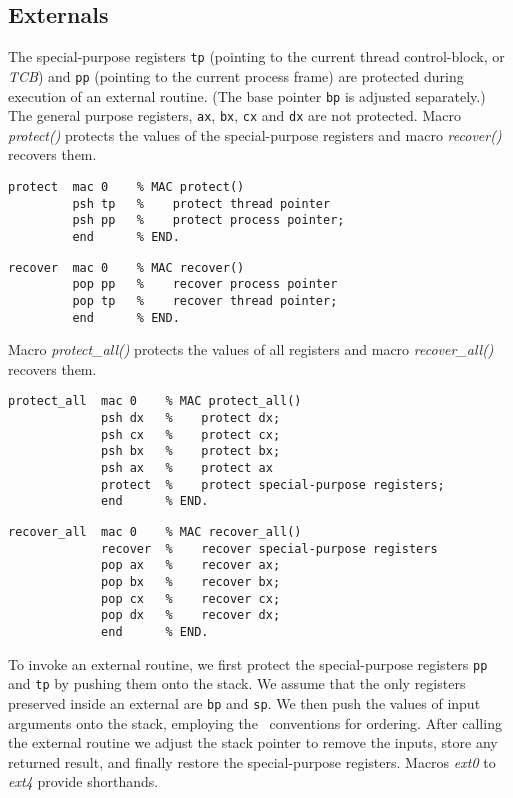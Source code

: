 \subsection{Externals}\label{externals}

The special-purpose registers \texttt{tp} (pointing to the current thread control-block, or \emph{TCB}) and \texttt{pp} (pointing to the current process frame) are protected during execution of an external routine. (The base pointer \texttt{bp} is adjusted separately.) The general purpose registers, \texttt{ax}, \texttt{bx}, \texttt{cx} and \texttt{dx} are not protected. Macro \textit{protect()} protects the values of the special-purpose registers and macro \textit{recover()} recovers them.


{\small
\begin{verbatim}
protect  mac 0    % MAC protect()
         psh tp   %    protect thread pointer
         psh pp   %    protect process pointer;
         end      % END.
\end{verbatim}}

{\small
\begin{verbatim}
recover  mac 0    % MAC recover()
         pop pp   %    recover process pointer
         pop tp   %    recover thread pointer;
         end      % END.
\end{verbatim}}

Macro \textit{protect\_all()} protects the values of all registers and macro \textit{recover\_all()} recovers them.


{\small
\begin{verbatim}
protect_all  mac 0    % MAC protect_all()
             psh dx   %    protect dx;
             psh cx   %    protect cx;
             psh bx   %    protect bx;
             psh ax   %    protect ax
             protect  %    protect special-purpose registers;
             end      % END.
\end{verbatim}}

{\small
\begin{verbatim}
recover_all  mac 0    % MAC recover_all()
             recover  %    recover special-purpose registers
             pop ax   %    recover ax;
             pop bx   %    recover bx;
             pop cx   %    recover cx;
             pop dx   %    recover dx;
             end      % END.
\end{verbatim}}



To invoke an external routine, we first protect the special-purpose registers \texttt{pp} and \texttt{tp} by pushing them onto the stack. We assume that the only registers preserved inside an external are \texttt{bp} and \texttt{sp}. We then push the values of input arguments onto the stack, employing the \cc\ conventions for ordering. After calling the external routine we adjust the stack pointer to remove the inputs, store any returned result, and finally restore the special-purpose registers. Macros \textit{ext0} to \textit{ext4} provide shorthands.

